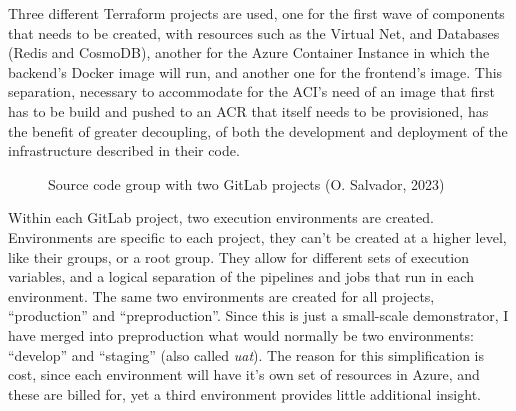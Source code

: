 \documentclass[11pt]{article}
\begin{document}
\begin{flushleft}
    Three different Terraform projects are used, one for the first wave of components that needs to be created, with resources such as the Virtual Net, and Databases (Redis and CosmoDB), another for the Azure Container Instance in which the backend's Docker image will run, and another one for the frontend's image. This separation, necessary to accommodate for the ACI's need of an image that first has to be build and pushed to an ACR that itself needs to be provisioned, has the benefit of greater decoupling, of both the development and deployment of the infrastructure described in their code.
    \linebreak


        \begin{figure}[htb]
    		\centering
    		\caption{Source code group with two GitLab projects (O. Salvador, 2023)}
    	\end{figure}

    Within each GitLab project, two execution environments are created. Environments are specific to each project, they can't be created at a higher level, like their groups, or a root group. They allow for different sets of execution variables, and a logical separation of the pipelines and jobs that run in each environment. The same two environments are created for all projects, ``production'' and ``preproduction''. Since this is just a small-scale demonstrator, I have merged into preproduction what would normally be two environments: ``develop'' and ``staging'' (also called \textit{\acrshort{uat}}). The reason for this simplification is cost, since each environment will have it's own set of resources in Azure, and these are billed for, yet a third environment provides little additional insight.
    \linebreak


\end{flushleft}
\end{document}
